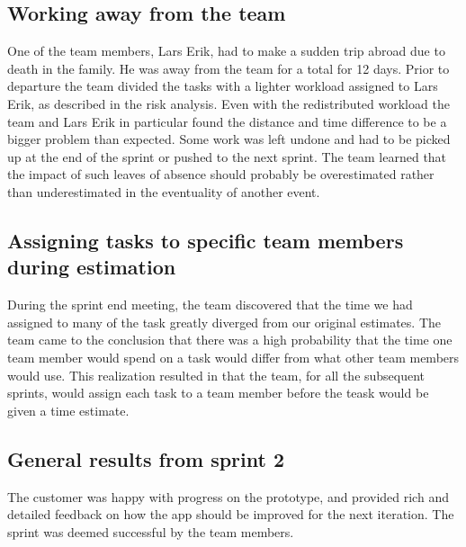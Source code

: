 \subsection{Working away from the team}
One of the team members, Lars Erik, had to make a sudden trip abroad due to
death in the family. He was away from the team for a total for 12 days. Prior
to departure the team divided the tasks with a lighter workload assigned to Lars
Erik, as described in the risk analysis. Even with the redistributed workload
the team and Lars Erik in particular found the distance and time difference to
be a bigger problem than expected. Some work was left undone and had to be
picked up at the end of the sprint or pushed to the next sprint. The team
learned that the impact of such leaves of absence should probably be
overestimated rather than underestimated in the eventuality of another event.

\subsection{Assigning tasks to specific team members during estimation}
During the sprint end meeting, the team discovered that the time we had assigned to many of the task greatly diverged from our original estimates. The team came to the conclusion that there was a high probability that the time one team member would spend on a task would differ from what other team members would use. This realization resulted in that the team, for all the subsequent sprints, would assign each task to a team member before the teask would be given a time estimate.

\subsection{General results from sprint 2} 
The customer was happy with progress on the prototype, and provided rich and detailed feedback on how the app should be improved for the next iteration. The sprint was deemed successful by the team members.
